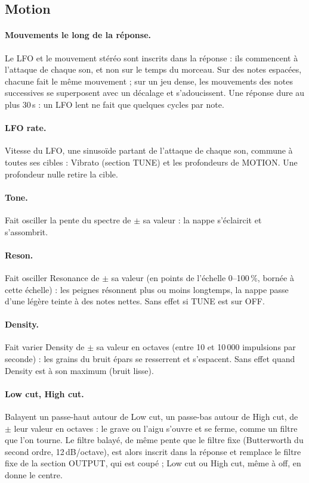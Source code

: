 \documentclass[a4paper,11pt]{article}
\newcommand{\dB}{\,dB}
\begin{document}
\subsection{Motion}\label{sec:lfo}

\paragraph{Mouvements le long de la réponse.} Le LFO et le mouvement stéréo sont
inscrits dans la réponse : ils commencent à l'attaque de chaque son, et non sur le temps du
morceau. Sur des notes espacées, chacune fait le même mouvement ; sur un jeu dense, les mouvements
des notes successives se superposent avec un décalage et s'adoucissent. Une réponse dure au plus
30\,s : un LFO lent ne fait que quelques cycles par note.

\paragraph{LFO rate.} Vitesse du LFO, une sinusoïde partant de l'attaque de chaque son, commune à
toutes ses cibles : Vibrato (section TUNE) et les profondeurs de MOTION. Une profondeur nulle
retire la cible.

\paragraph{Tone.} Fait osciller la pente du spectre de $\pm$ sa valeur : la nappe s'éclaircit et
s'assombrit.

\paragraph{Reson.} Fait osciller Resonance de $\pm$ sa valeur (en points de l'échelle 0--100\,\%,
bornée à cette échelle) : les peignes résonnent plus ou moins longtemps, la nappe passe d'une
légère teinte à des notes nettes. Sans effet si TUNE est sur OFF.

\paragraph{Density.} Fait varier Density de $\pm$ sa valeur en octaves (entre 10 et 10\,000
impulsions par seconde) : les grains du bruit épars se resserrent et s'espacent. Sans effet quand
Density est à son maximum (bruit lisse).

\paragraph{Low cut, High cut.} Balayent un passe-haut autour de Low cut, un passe-bas autour de
High cut, de $\pm$ leur valeur en octaves : le grave ou l'aigu s'ouvre et se ferme, comme un
filtre que l'on tourne. Le filtre balayé, de même pente que le filtre fixe (Butterworth du second
ordre, 12\dB/octave), est alors inscrit dans la réponse et remplace le filtre fixe de la section
OUTPUT, qui est coupé ; Low cut ou High cut, même à \og off\fg, en donne le centre.
\end{document}
